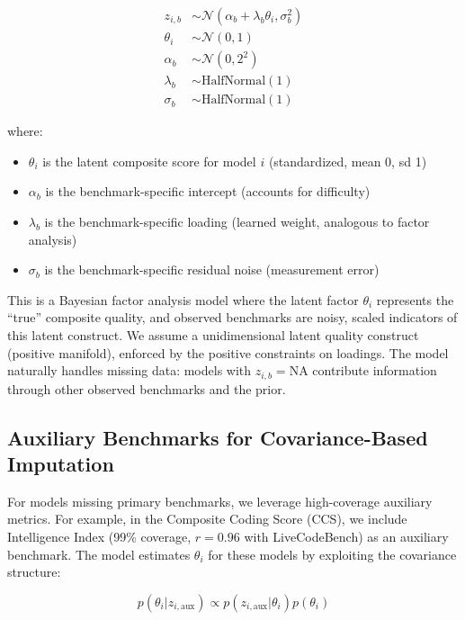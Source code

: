 \begin{align}
z_{i,b} &\sim \mathcal{N}(\alpha_b + \lambda_b \theta_i, \sigma_b^2) \label{eq:likelihood} \\
\theta_i &\sim \mathcal{N}(0, 1) \label{eq:latent_prior} \\
\alpha_b &\sim \mathcal{N}(0, 2^2) \label{eq:intercept_prior} \\
\lambda_b &\sim \text{HalfNormal}(1) \label{eq:loading_prior} \\
\sigma_b &\sim \text{HalfNormal}(1) \label{eq:noise_prior}
\end{align}

where:
\begin{itemize}
    \item $\theta_i$ is the latent composite score for model $i$ (standardized, mean 0, sd 1)
    \item $\alpha_b$ is the benchmark-specific intercept (accounts for difficulty)
    \item $\lambda_b$ is the benchmark-specific loading (learned weight, analogous to factor analysis)
    \item $\sigma_b$ is the benchmark-specific residual noise (measurement error)
\end{itemize}

This is a Bayesian factor analysis model where the latent factor $\theta_i$ represents the ``true'' composite quality, and observed benchmarks are noisy, scaled indicators of this latent construct. We assume a unidimensional latent quality construct (positive manifold), enforced by the positive constraints on loadings. The model naturally handles missing data: models with $z_{i,b} = \text{NA}$ contribute information through other observed benchmarks and the prior.

\subsection{Auxiliary Benchmarks for Covariance-Based Imputation}

For models missing primary benchmarks, we leverage high-coverage auxiliary metrics. For example, in the Composite Coding Score (CCS), we include Intelligence Index (99\% coverage, $r=0.96$ with LiveCodeBench) as an auxiliary benchmark. The model estimates $\theta_i$ for these models by exploiting the covariance structure:

\begin{equation}
p(\theta_i | z_{i,\text{aux}}) \propto p(z_{i,\text{aux}} | \theta_i) p(\theta_i)
\end{equation}

